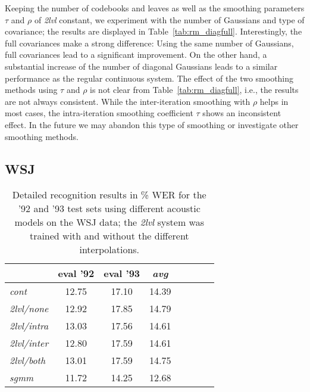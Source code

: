 \documentclass{article}
\begin{document}
Keeping the number of codebooks and leaves as well as the smoothing parameters
$\tau$ and $\rho$ of {\em 2lvl} constant, we experiment with the number of
Gaussians and type of covariance; the results are displayed in 
Table~\ref{tab:rm_diagfull}.
Interestingly, the full covariances make a strong difference: Using the same
number of Gaussians, full covariances lead to a significant improvement.
On the other hand, a substantial increase of the number of diagonal Gaussians 
leads to a similar performance as the regular continuous system.
%
The effect of the two smoothing methods using $\tau$ and $\rho$ is not
clear from Table~\ref{tab:rm_diagfull}, i.e., the results are not always
consistent.  While the inter-iteration smoothing with $\rho$
helps in most cases, the intra-iteration smoothing coefficient $\tau$ 
shows an inconsistent effect.  In the future we may abandon this type of
smoothing or investigate other smoothing methods. 


\subsection{WSJ}

\begin{table}%
\begin{center}
\begin{tabular}{|l||c|c|c|c|c|c||c|}
\hline
~                & eval '92 & eval '93 & {\em avg} \\ \hline\hline
{\em cont}       &    12.75 &    17.10 &     14.39 \\ \hline
{\em 2lvl/none}  &    12.92 &    17.85 &     14.79 \\ \hline
{\em 2lvl/intra} &    13.03 &    17.56 &     14.61 \\ \hline
{\em 2lvl/inter} &    12.80 &    17.59 &     14.61 \\ \hline
{\em 2lvl/both}  &    13.01 &    17.59 &     14.75 \\ \hline
{\em sgmm}       &    11.72 &    14.25 &     12.68 \\ \hline
\end{tabular}
\end{center}
\caption{\label{tab:res_wsj}
Detailed recognition results in \% WER for the '92 and '93 test sets using 
different acoustic models on the WSJ data; the {\em 2lvl} system was trained
with and without the different interpolations.
}
\end{table}
\end{document}
